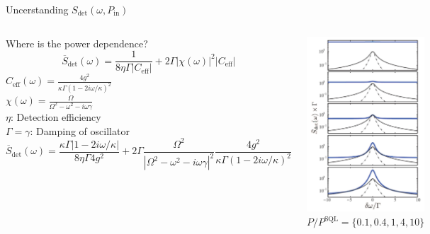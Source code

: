 \documentclass{beamer}
\begin{document}
\begin{frame}{Uncerstanding $S_\text{det}(\omega, P_\text{in})$}
	\begin{columns}
		Where is the power dependence?
		$$
		\overline S_\text{det}(\omega)
		= \frac{1}{8 \eta \Gamma |C_\text{eff}|}
		+ 2 \Gamma |\chi(\omega)|^2 |C_\text{eff}|
		$$
		$C_\text{eff}(\omega) = \frac{4 g^2}{\kappa \Gamma(1-2 i\omega /\kappa)^2}$\\
		$\chi(\omega) = \frac{\Omega}{\Omega^2 - \omega^2 - i\omega\gamma}$ \\
		$\eta$: Detection efficiency\\
		$\Gamma = \gamma$: Damping of oscillator\\
		
		\tiny 
		$$
		\overline S_\text{det}(\omega)
		= \frac{\kappa\Gamma |1-2i\omega/\kappa|}{8 \eta \Gamma 4 g^2}
		+ 2 \Gamma \frac{\Omega^2}{|\Omega^2-\omega^2-i\omega\gamma|^2}
		\frac{4 g^2}{\kappa \Gamma(1-2 i\omega /\kappa)^2}
		$$
		

		\small\centering
		\includegraphics[width=\textwidth]{figures/3.5.png}
		$P/P^\text{SQL} = \{0.1, 0.4, 1, 4, 10\}$

	\end{columns}
\end{frame}
\end{document}
